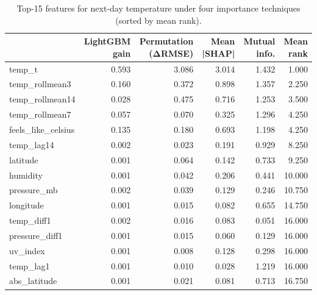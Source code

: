 \begin{table}
\caption{Top-15 features for next-day temperature under four importance techniques (sorted by mean rank).}
\label{tab:feature_importance}
\begin{tabular}{lrrrrr}
\toprule
 & LightGBM gain & Permutation (ΔRMSE) & Mean |SHAP| & Mutual info. & Mean rank \\
\midrule
temp\_t & 0.593 & 3.086 & 3.014 & 1.432 & 1.000 \\
temp\_rollmean3 & 0.160 & 0.372 & 0.898 & 1.357 & 2.250 \\
temp\_rollmean14 & 0.028 & 0.475 & 0.716 & 1.253 & 3.500 \\
temp\_rollmean7 & 0.057 & 0.070 & 0.325 & 1.296 & 4.250 \\
feels\_like\_celsius & 0.135 & 0.180 & 0.693 & 1.198 & 4.250 \\
temp\_lag14 & 0.002 & 0.023 & 0.191 & 0.929 & 8.250 \\
latitude & 0.001 & 0.064 & 0.142 & 0.733 & 9.250 \\
humidity & 0.001 & 0.042 & 0.206 & 0.441 & 10.000 \\
pressure\_mb & 0.002 & 0.039 & 0.129 & 0.246 & 10.750 \\
longitude & 0.001 & 0.015 & 0.082 & 0.655 & 14.750 \\
temp\_diff1 & 0.002 & 0.016 & 0.083 & 0.051 & 16.000 \\
pressure\_diff1 & 0.001 & 0.015 & 0.060 & 0.129 & 16.000 \\
uv\_index & 0.001 & 0.008 & 0.128 & 0.298 & 16.000 \\
temp\_lag1 & 0.001 & 0.010 & 0.028 & 1.219 & 16.000 \\
abs\_latitude & 0.001 & 0.021 & 0.081 & 0.713 & 16.750 \\
\bottomrule
\end{tabular}
\end{table}
